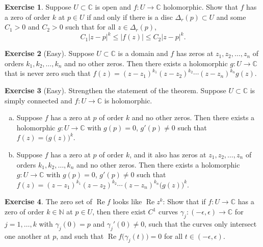 \documentclass[12pt,openany]{book}
\renewcommand{\Re}{\operatorname{Re}}
\newcommand{\sabs}[1]{\lvert {#1} \rvert}
\newcommand{\C}{{\mathbb{C}}}
\newcommand{\N}{{\mathbb{N}}}
\theoremstyle{plain}
\theoremstyle{remark}
\theoremstyle{definition}
\newenvironment{exbox}{%
    \def\FrameCommand{\vrule width 1pt \relax\hspace{10pt}}%
    \MakeFramed{\advance\hsize-\width\FrameRestore}%
}{%
    \endMakeFramed
}
\newenvironment{exparts}{%
    \leavevmode\begin{enumerate}[a),noitemsep,topsep=0pt,parsep=0pt,partopsep=0pt]
}{%
    \end{enumerate}
}
\theoremstyle{exercise}
\newtheorem{exercise}{Exercise}[section]
\theoremstyle{example}
\begin{document}
\begin{exbox}
\begin{exercise}%
\label{exercise:order}
Suppose $U \subset \C$ is open and
$f \colon U \to \C$ holomorphic.
Show that $f$ has a zero of order $k$ at $p \in U$
if and only if
there is a disc $\Delta_r(p) \subset U$ and some $C_1 > 0$ and $C_2 > 0$
such that for
all $z \in \Delta_r(p)$,
\begin{equation*}
C_1 {\sabs{z-p}}^k
\leq
\sabs{f(z)}
\leq
C_2 {\sabs{z-p}}^k .
\end{equation*}
\end{exercise}

\begin{exercise}[Easy]
Suppose $U \subset \C$ is a domain and $f$ 
has zeros at $z_1, z_2, \ldots, z_n$ of
orders $k_1, k_2, \ldots, k_n$ and no other zeros.
Then there exists a holomorphic
$g \colon U \to \C$ that is never zero
such that $f(z) = {(z-z_1)}^{k_1}{(z-z_2)}^{k_2}\cdots{(z-z_n)}^{k_n} g(z).$
\end{exercise}

\begin{exercise}[Easy]
Strengthen the statement of the theorem.
Suppose $U \subset \C$ is simply connected and $f \colon U \to \C$
is holomorphic.
\begin{exparts}
\item
Suppose $f$ has a zero at $p$ of
order $k$ and no other zeros.
Then there exists a holomorphic
$g \colon U \to \C$ with $g(p) = 0$, $g'(p) \not= 0$
such that $f(z) = {\bigl( g(z) \bigr)}^k$.
\item
Suppose $f$ has a zero at $p$
of order $k$,
and it also has zeros at $z_1, z_2, \ldots, z_n$ of
orders $k_1, k_2, \ldots, k_n$ and no other zeros.
Then there exists a holomorphic
$g \colon U \to \C$ with $g(p) = 0$, $g'(p) \not= 0$
such that $f(z) = {(z-z_1)}^{k_1}{(z-z_2)}^{k_2}\cdots{(z-z_n)}^{k_n} {\bigl( g(z) \bigr)}^k$.
\end{exparts}
\end{exercise}

\begin{exercise}
The zero set of $\Re f$ looks like $\Re z^k$:
Show that if $f \colon U \to \C$ has a zero of order $k \in \N$ at $p \in
U$, then there exist $C^1$ curves
$\gamma_j \colon (-\epsilon, \epsilon) \to \C$ for
$j=1,\ldots,k$ with $\gamma_j(0) = p$
and $\gamma_j'(0) \not= 0$, such that the curves only intersect
one another
at $p$, and such that $\Re f\bigl( \gamma_j(t) \bigr) = 0$ for
all $t \in (-\epsilon,\epsilon)$.
\end{exercise}


\end{exbox}
\end{document}

